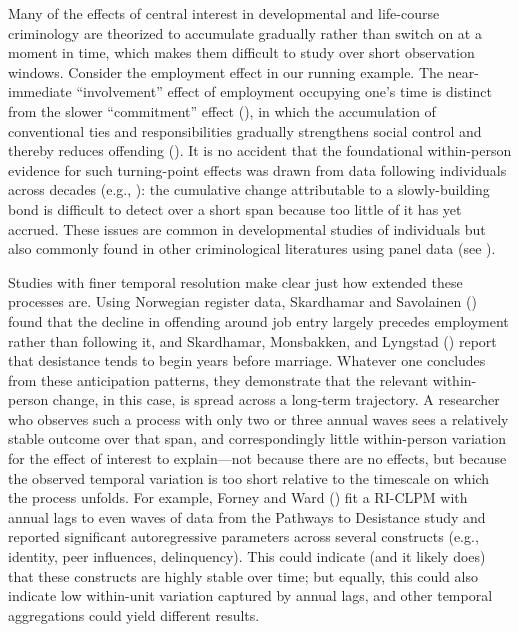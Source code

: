 \documentclass[
  letterpaper,
  DIV=11,
  numbers=noendperiod]{scrartcl}
\begin{document}
Many of the effects of central interest in developmental and life-course
criminology are theorized to accumulate gradually rather than switch on
at a moment in time, which makes them difficult to study over short
observation windows. Consider the employment effect in our running
example. The near-immediate ``involvement'' effect of employment
occupying one's time is distinct from the slower ``commitment'' effect
(), in which the
accumulation of conventional ties and responsibilities gradually
strengthens social control and thereby reduces offending
(). It is no
accident that the foundational within-person evidence for such
turning-point effects was drawn from data following individuals across
decades (e.g., ): the cumulative change attributable to a slowly-building bond is
difficult to detect over a short span because too little of it has yet
accrued. These issues are common in developmental studies of individuals
but also commonly found in other criminological literatures using panel
data (see ).

Studies with finer temporal resolution make clear just how extended
these processes are. Using Norwegian register data, Skardhamar and
Savolainen () found that the
decline in offending around job entry largely precedes employment rather
than following it, and Skardhamar, Monsbakken, and Lyngstad
() report that desistance tends
to begin years before marriage. Whatever one concludes from these
anticipation patterns, they demonstrate that the relevant within-person
change, in this case, is spread across a long-term trajectory. A
researcher who observes such a process with only two or three annual
waves sees a relatively stable outcome over that span, and
correspondingly little within-person variation for the effect of
interest to explain---not because there are no effects, but because the
observed temporal variation is too short relative to the timescale on
which the process unfolds. For example, Forney and Ward
() fit a RI-CLPM with annual lags
to even waves of data from the Pathways to Desistance study and reported
significant autoregressive parameters across several constructs (e.g.,
identity, peer influences, delinquency). This could indicate (and it
likely does) that these constructs are highly stable over time; but
equally, this could also indicate low within-unit variation captured by
annual lags, and other temporal aggregations could yield different
results.
\end{document}
